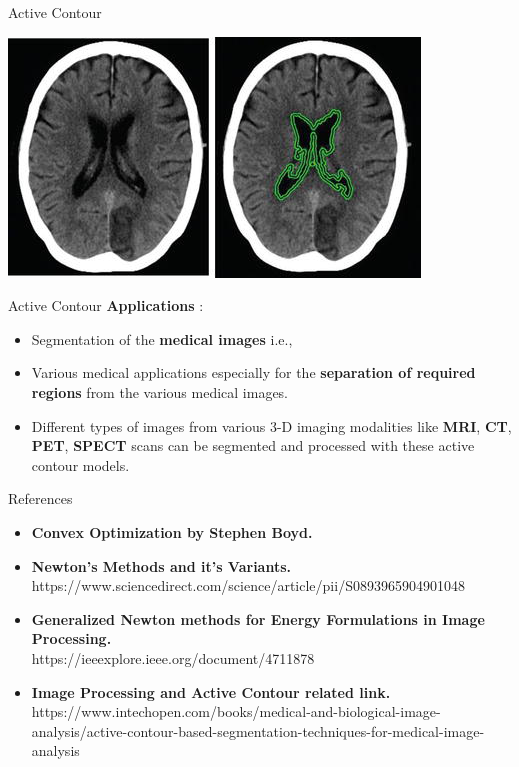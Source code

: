 \documentclass[10pt]{beamer}
\begin{document}
\begin{frame}{Active Contour}
    \begin{center}
    \graphicspath{ {./images/} }
    \includegraphics [scale=1] {F1}
\end{center}
\end{frame}

\begin{frame}{Active Contour}
\textbf{Applications} :
 \begin{itemize}
     \item Segmentation of the \textbf{medical images} i.e.,
     \vspace{2mm}
     \item Various medical applications especially for the \textbf{separation of required regions} from the various medical images.
     \vspace{2mm}\ \\
      \item Different types of images from various 3-D imaging modalities like \textbf{MRI}, \textbf{CT}, \textbf{PET}, \textbf{SPECT} scans can be segmented and processed with these active contour models.
   \end{itemize}
\end{frame}

\begin{frame}{References}
\begin{itemize}
    \item \textbf{Convex Optimization by Stephen Boyd.}
    \item \textbf{Newton's Methods and it's Variants.}
     \vspace{1mm}\ \\
    https://www.sciencedirect.com/science/article/pii/S0893965904901048
    \item \textbf{Generalized Newton methods for Energy Formulations in Image Processing.}
     \vspace{1mm} \ \\
            https://ieeexplore.ieee.org/document/4711878
     \vspace{2mm}
     \item \textbf{Image Processing and Active Contour related link.}
     \vspace{1mm}\ \\
     https://www.intechopen.com/books/medical-and-biological-image-analysis/active-contour-based-segmentation-techniques-for-medical-image-analysis
      \end{itemize}
\end{frame}
\end{document}
